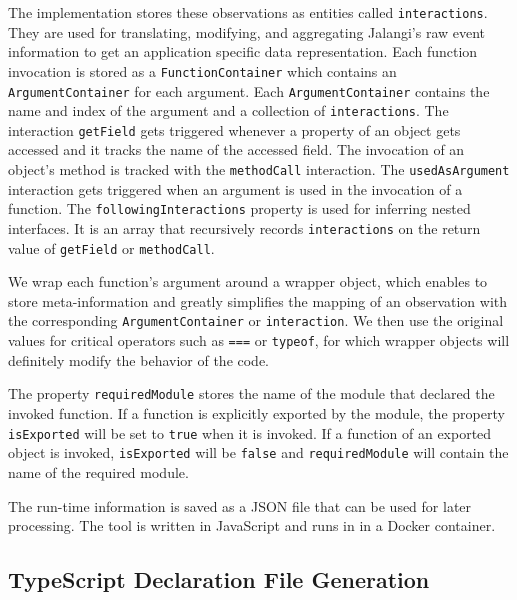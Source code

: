 \documentclass[english,cleveref,autoref,submission]{programming}
\begin{document}
The implementation stores these observations as entities called
\texttt{interactions}. They are used for translating, modifying, and
aggregating Jalangi's raw event information to get an application
specific data representation. Each function invocation is stored as a \texttt{FunctionContainer} which contains an \texttt{ArgumentContainer} for each argument. Each \texttt{ArgumentContainer} contains the name and index of the argument and a collection of \texttt{interactions}. The interaction \texttt{getField} gets triggered whenever a property of an object gets accessed and it tracks the name of the accessed field. The invocation of an object's method is tracked with the \texttt{methodCall} interaction. The \texttt{usedAsArgument} interaction gets triggered when an argument is used in the invocation of a function. The \texttt{followingInteractions} property is used for inferring nested interfaces. It is an array that recursively records \texttt{interactions} on the return value of \texttt{getField} or \texttt{methodCall}.

We wrap each function's argument around a wrapper object, which enables to store meta-information and greatly simplifies the mapping of an observation with the corresponding \texttt{ArgumentContainer} or \texttt{interaction}. We then use the original values for critical operators such as \texttt{===} or \texttt{typeof}, for which wrapper objects will definitely modify the behavior of the code.

The property \texttt{requiredModule} stores the name of the module that declared the invoked function. If a function is explicitly exported by the module, the property \texttt{isExported} will be set to \texttt{true} when it is invoked. If a function of an exported object is invoked, \texttt{isExported} will be \texttt{false} and \texttt{requiredModule} will contain the name of the required module.

The run-time information is saved as a JSON file that can be used for later processing. The tool is written in JavaScript and runs in \NodeJS{} in a Docker container. 

\subsection{TypeScript Declaration File Generation}
\label{sec:typescr-decl-file}
\end{document}
